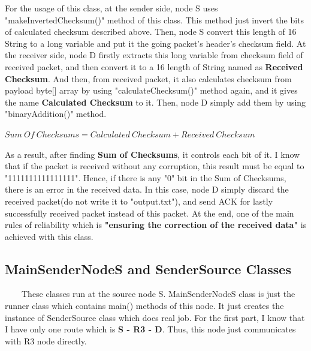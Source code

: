 \documentclass[12pt]{article}
\begin{document}
For the usage of this class, at the sender side, node S uses "makeInvertedChecksum()" method of this class. This method just invert the bits of calculated checksum described above. Then, node S convert this length of 16 String to a long variable and put it the going packet's header's checksum field. At the receiver side, node D firstly extracts this long variable from checksum field of received packet, and then convert it to a 16 length of String named as \textbf{Received Checksum}. And then, from received packet, it also calculates checksum from payload byte[] array by using "calculateChecksum()" method again, and it gives the name \textbf{Calculated Checksum} to it. Then, node D simply add them by using "binaryAddition()" method.
\begin{center}
$Sum \ Of \ Checksums = Calculated \ Checksum + Received \ Checksum$
\end{center}

As a result, after finding \textbf{Sum of Checksums}, it controls each bit of it. I know that if the packet is received without any corruption, this result must be equal to "1111111111111111". Hence, if there is any "0" bit in the Sum of Checksums, there is an error in the received data. In this case, node D simply discard the received packet(do not write it to "output.txt"), and send ACK for lastly successfully received packet instead of this packet. At the end, one of the main rules of reliability which is \textbf{"ensuring the correction of the received data"} is achieved with this class.   



\subsection{MainSenderNodeS and SenderSource Classes}

\ \ \ \ These classes run at the source node S. MainSenderNodeS class is just the runner class which contains main() methods of this node. It just creates the instance of SenderSource class which does real job. For the first part, I know that I have only one route which is \textbf{S - R3 - D}. Thus, this node just communicates with R3 node directly.
\end{document}
